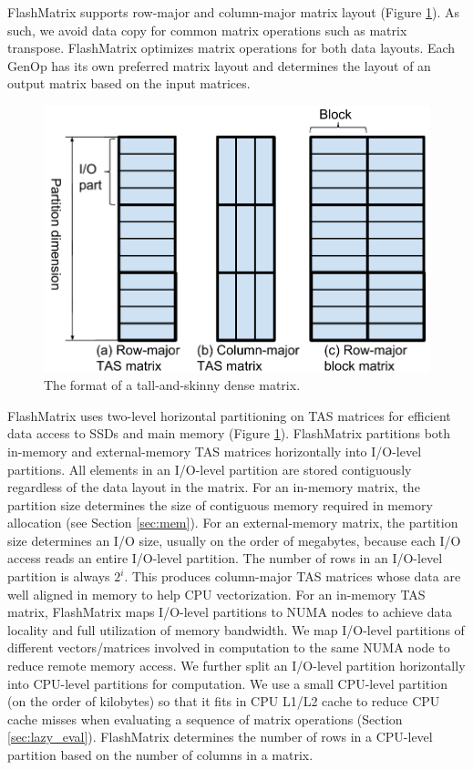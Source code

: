 FlashMatrix supports row-major and column-major matrix layout (Figure
\ref{fig:tas_mat}). As such, we avoid data copy for common matrix operations
such as matrix transpose. FlashMatrix optimizes matrix operations for both
data layouts. Each GenOp has its own preferred matrix layout and determines
the layout of an output matrix based on the input matrices.

\begin{figure}
	\centering
	\includegraphics[scale=0.5]{FlashMatrix_figs/dense_matrix2.pdf}
	\caption{The format of a tall-and-skinny dense matrix.}
	\label{fig:tas_mat}
\end{figure}

FlashMatrix uses two-level horizontal partitioning on TAS matrices for
efficient data access to SSDs and main memory (Figure \ref{fig:tas_mat}).
FlashMatrix partitions both in-memory and
external-memory TAS matrices horizontally into I/O-level partitions.
All elements in an I/O-level partition are stored contiguously regardless
of the data layout in the matrix. For an in-memory matrix, the partition
size determines the size of contiguous memory required in memory allocation
(see Section \ref{sec:mem}). For an external-memory matrix, the partition
size determines an I/O size, usually on the order of megabytes, because each
I/O access reads an entire I/O-level partition. The number of rows in
an I/O-level partition is always $2^i$. This produces column-major TAS
matrices whose data are well aligned in memory to help CPU vectorization.
For an in-memory TAS matrix, FlashMatrix maps I/O-level partitions to NUMA
nodes to achieve data locality and full utilization of memory bandwidth.
We map I/O-level partitions of different vectors/matrices involved in
computation to the same NUMA node to reduce remote memory access.
We further split an I/O-level partition
horizontally into CPU-level partitions for computation. We use a small
CPU-level partition (on the order of kilobytes) so that it fits in CPU
L1/L2 cache to reduce CPU cache misses when evaluating a sequence of matrix
operations (Section \ref{sec:lazy_eval}). FlashMatrix determines the number
of rows in a CPU-level partition based on the number of columns in a matrix.

